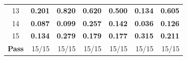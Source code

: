 \begin{table}[t!]
\begin{tabular*}{\columnwidth}{@{\extracolsep{\fill}}crrrrrr}
		13 & \textbf{0.201} & \textbf{0.820} & \textbf{0.620} & \textbf{0.500} & \textbf{0.134} & \textbf{0.605} \\
		14 & \textbf{0.087} & \textbf{0.099} & \textbf{0.257} & \textbf{0.142} & \textbf{0.036} & \textbf{0.126} \\
		15 & \textbf{0.134} & \textbf{0.279} & \textbf{0.179} & \textbf{0.177} & \textbf{0.315} & \textbf{0.211} \\
		\midrule
		\textbf{Pass} & 15/15 & 15/15 & 15/15 & 15/15 & 15/15 & 15/15 \\
		\bottomrule
	\end{tabular*}
\end{table}